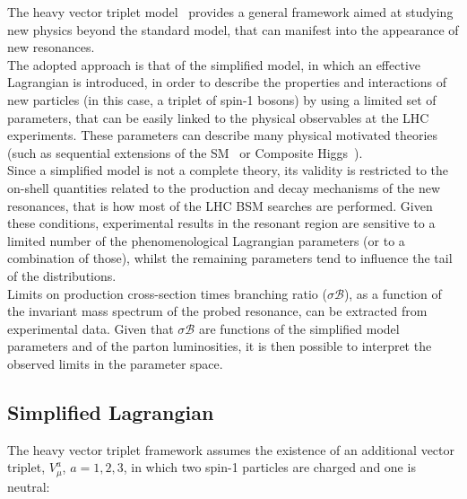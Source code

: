 The heavy vector triplet model~\cite{Pappadopulo2014} provides a general framework aimed at studying new physics beyond the standard model, that can manifest into the appearance of new resonances.\\
The adopted approach is that of the simplified model, in which an effective Lagrangian is introduced, in order to describe the properties and interactions of new particles (in this case, a triplet of spin-1 bosons) by using a limited set of parameters, that can be easily linked to the physical observables at the LHC experiments. These parameters can describe many physical motivated theories (such as sequential extensions of the SM~\cite{Barger:1980ix,Grojean:2011vu} or Composite Higgs~\cite{Contino2011,Bellazzini:2014yua}). \\
Since a simplified model is not a complete theory, its validity is restricted to the on-shell quantities related to the production and decay mechanisms of the new resonances, that is how most of the LHC BSM searches are performed. Given these conditions, experimental results in the resonant region are sensitive to a limited number of the phenomenological Lagrangian parameters (or to a combination of those), whilst the remaining parameters tend to influence the tail of the distributions.\\
Limits on production cross-section times branching ratio ($\sigma \mathcal{B}$), as a function of the invariant mass spectrum of the probed resonance, can be extracted from experimental data. Given that $\sigma \mathcal{B}$ are functions of the simplified model parameters and of the parton luminosities, it is then possible to interpret the observed limits in the parameter space.

\subsection{Simplified Lagrangian}
\label{sec:HVT_lagr}

The heavy vector triplet framework assumes the existence of an additional vector triplet, $V_{\mu}^a$, $a=1,2,3$, in which two spin-1 particles are charged and one is neutral:

